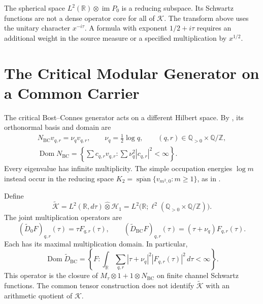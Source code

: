 The spherical space \(L^2(\mathbb R)\otimes\operatorname{im}P_0\)
is a reducing subspace. Its Schwartz functions are not a dense
operator core for all of \(\mathcal K\).
The transform above uses the unitary character \(x^{-i\tau}\).
A formula with exponent \(1/2+i\tau\) requires an additional
weight in the source measure or a specified multiplication by
\(x^{1/2}\).

\section{The Critical Modular Generator on a Common Carrier}
\label{v4-arith:w7-j:framework:generator}

The critical Bost--Connes generator acts on a different Hilbert space.
By , its orthonormal basis and domain are
\[
 \begin{gathered}
 N_{\mathrm{BC}}v_{q,r}=\nu_qv_{q,r},\qquad
 \nu_q=\tfrac12\log q,\qquad
 (q,r)\in\mathbb Q_{>0}\times\mathbb Q/\mathbb Z,\\
 \operatorname{Dom}N_{\mathrm{BC}}
 =\left\{\sum c_{q,r}v_{q,r}:
               \sum\nu_q^2|c_{q,r}|^2<\infty\right\}.
 \end{gathered}
\]
Every eigenvalue has infinite multiplicity. The simple occupation
energies \(\log m\) instead occur in the reducing space
\(K_2=\overline{\operatorname{span}}\{v_{m^2,0}:m\geq1\}\),
as in .

\begin{definition}
\label{v4-arith:w7-j:def:scattering-space}
Define
\begin{equation}
\label{v4-arith:w7-j:eq:H-scatter}
 \widetilde{\mathcal K}
 =L^2(\mathbb R,d\tau)\widehat\otimes\mathcal H_1
 =L^2\bigl(\mathbb R;\ell^2(\mathbb Q_{>0}\times\mathbb Q/\mathbb Z)\bigr).
\end{equation}
The joint multiplication operators are
\begin{equation}
\label{v4-arith:w7-j:eq:D-BC}
 (\widetilde D_0F)_{q,r}(\tau)=\tau F_{q,r}(\tau),\qquad
 (\widetilde D_{\mathrm{BC}}F)_{q,r}(\tau)
   =(\tau+\nu_q)F_{q,r}(\tau).
\end{equation}
Each has its maximal multiplication domain. In particular,
\[
 \operatorname{Dom}\widetilde D_{\mathrm{BC}}
 =\left\{F:\int_{\mathbb R}\sum_{q,r}
 |\tau+\nu_q|^2|F_{q,r}(\tau)|^2\,d\tau<\infty\right\}.
\]
This operator is the closure of
\(M_\tau\otimes1+1\otimes N_{\mathrm{BC}}\) on finite channel Schwartz
functions. The common tensor construction does not identify
\(\widetilde{\mathcal K}\) with an arithmetic quotient of \(\mathcal K\).
\end{definition}

